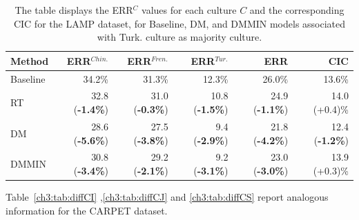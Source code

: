 %
%
\begin{table}
\centering
\begin{tabular}{lrrrrr}
\toprule
\textbf{Method} & \textbf{ERR$^{Chin.}$} & \textbf{ERR$^{Fren.}$} & \textbf{ERR$^{Tur.}$} & \textbf{ERR} & \textbf{CIC} \\
\midrule
Baseline     & 34.2\% & 31.3\% & 12.3\% & 26.0\% & 13.6\% \\
RT           & 32.8 (\textbf{-1.4\%}) & 31.0 (\textbf{-0.3\%}) & 10.8 (\textbf{-1.5\%}) & 24.9 (\textbf{-1.1\%}) & 14.0 (+0.4)\% \\
DM           & 28.6 (\textbf{-5.6\%}) & 27.5 (\textbf{-3.8\%}) & 9.4 (\textbf{-2.9\%}) & 21.8 (\textbf{-4.2\%}) & 12.4 (\textbf{-1.2\%}) \\
DMMIN        & 30.8 (\textbf{-3.4\%}) & 29.2 (\textbf{-2.1\%}) & 9.2 (\textbf{-3.1\%}) & 23.0 (\textbf{-3.0\%}) & 13.9 (+0.3)\% \\
\bottomrule
\end{tabular}
\caption{The table displays the ERR$^C$ values for each culture $C$ and the corresponding CIC for the LAMP dataset, for Baseline, DM, and DMMIN models associated with Turk. culture as majority culture.}
\label{ch3:tab:diffLT}
\end{table}
%
Table~\ref{ch3:tab:diffCI} ,\ref{ch3:tab:diffCJ} and \ref{ch3:tab:diffCS} report analogous information for the CARPET dataset.

